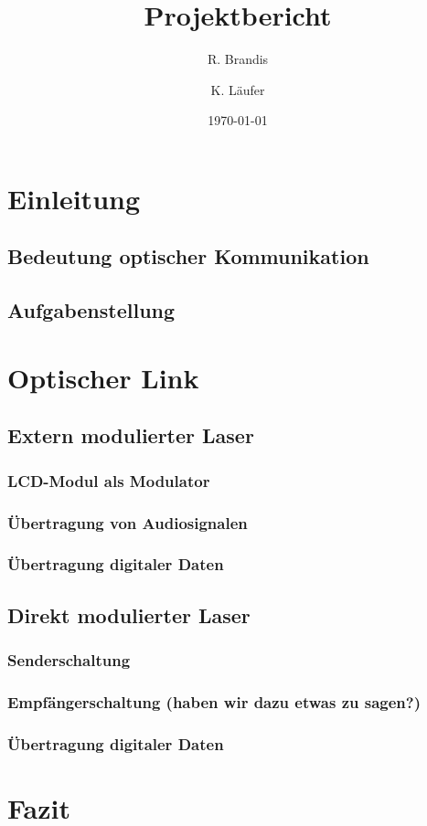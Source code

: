 \documentclass[12pt,a4paper]{article}
\title{Projektbericht}
\author{R. Brandis \and K. Läufer}
\date{\today}
\begin{document}
\maketitle
\newpage
\tableofcontents
\newpage

\section{Einleitung}

\subsection{Bedeutung optischer Kommunikation}
\subsection{Aufgabenstellung}

\section{Optischer Link}

\subsection{Extern modulierter Laser}

\subsubsection{LCD-Modul als Modulator}
\subsubsection{Übertragung von Audiosignalen}
\subsubsection{Übertragung digitaler Daten}

\subsection{Direkt modulierter Laser}
\subsubsection{Senderschaltung}
\subsubsection{Empfängerschaltung (haben wir dazu etwas zu sagen?)}
\subsubsection{Übertragung digitaler Daten}

\section{Fazit}
\end{document}
